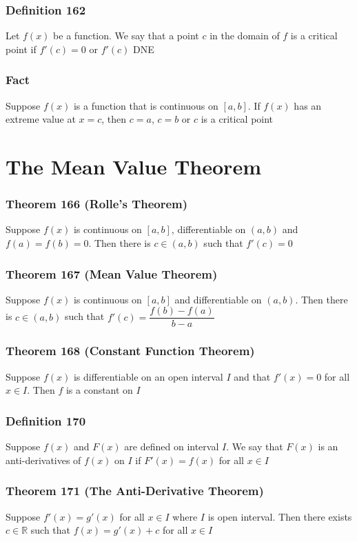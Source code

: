 \documentclass[12pt, letterpaper]{article}
\begin{document}
\subsubsection*{Definition 162}
Let $f(x)$ be a function. We say that a point $c$ in the domain of $f$ is a critical point if $f'(c) = 0$ or $f'(c)$ DNE
\subsubsection*{Fact}
Suppose $f(x)$ is a function that is continuous on $[a,b]$. If $f(x)$ has an extreme value at $x=c$, then
$c=a$, $c=b$ or $c$ is a critical point


\section{The Mean Value Theorem}
\subsubsection*{Theorem 166 (Rolle's Theorem)}
Suppose $f(x)$ is continuous on $[a,b]$, differentiable on $(a,b)$ and $f(a) = f(b) = 0$. Then there 
is $c\in(a,b)$ such that $f'(c) = 0$
\subsubsection*{Theorem 167 (Mean Value Theorem)}
Suppose $f(x)$ is continuous on $[a,b]$ and differentiable on $(a,b)$. Then there is $c\in(a,b)$ such that
$f'(c) = \dfrac{f(b) - f(a)}{b-a}$
\subsubsection*{Theorem 168 (Constant Function Theorem)}
Suppose $f(x)$ is differentiable on an open interval $I$ and that $f'(x) = 0$ for all $x\in I$. Then $f$ is a constant on $I$
\subsubsection*{Definition 170}
Suppose $f(x)$ and $F(x)$ are defined on interval $I$. We say that $F(x)$ is an anti-derivatives of $f(x)$ on $I$ if $F'(x) = f(x)$ for all $x\in I$
\subsubsection*{Theorem 171 (The Anti-Derivative Theorem)}
Suppose $f'(x) = g'(x)$ for all $x\in I$ where $I$ is open interval. Then there exists $c\in \mathbb{R}$ such that 
$f(x) = g'(x)+c$ for all $x\in I$ 
\end{document}
